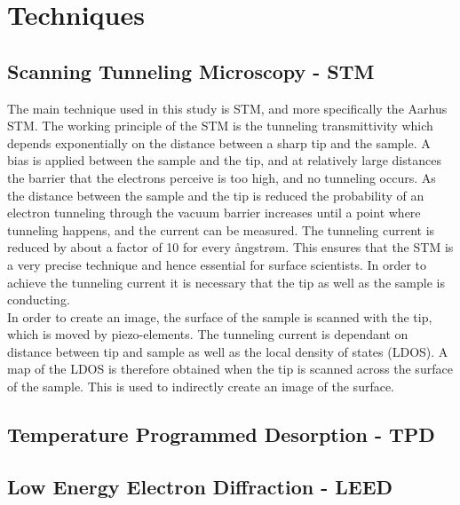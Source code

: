 \chapter{Techniques}

\section{Scanning Tunneling Microscopy - STM}

The main technique used in this study is STM, and more specifically the Aarhus STM. The working principle of the STM is the tunneling transmittivity which depends exponentially on the distance between a sharp tip and the sample. A bias is applied between the sample and the tip, and at relatively large distances the barrier that the electrons perceive is too high, and no tunneling occurs. As the distance between the sample and the tip is reduced the probability of an electron tunneling through the vacuum barrier increases until a point where tunneling happens, and the current can be measured. The tunneling current is reduced by about a factor of 10 for every ångstrøm.\cite{STMbinnig} This ensures that the STM is a very precise technique and hence essential for surface scientists. In order to achieve the tunneling current it is necessary that the tip as well as the sample is conducting.\\
In order to create an image, the surface of the sample is scanned with the tip, which is moved by piezo-elements. The tunneling current is dependant on distance between tip and sample as well as the local density of states (LDOS). A map of the LDOS is therefore obtained when the tip is scanned across the surface of the sample. This is used to indirectly create an image of the surface.\\


\section{Temperature Programmed Desorption - TPD}


\section{Low Energy Electron Diffraction - LEED}
